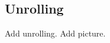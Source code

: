 \documentclass[12pt]{article}
\newtheorem{defn}{Definition}
\theoremstyle{remark}
\def\S{\textsf{S}}
\begin{document}
\subsection{Unrolling}
Add unrolling.
Add picture.

\begin{comment}
\section{Removing Sinks}
\label{sec4}

Let $\S$ be a set of sentence names and $d$ a denotation assignment on $\S$.  If $\chi$ is a constant sentence, then its normal form references no other sentence.  So, if name $\alpha \in \S$ denotes $\chi$, then we can simplify $(\S, d)$ by replacing each occurance of $\alpha$ with $\chi$.  We will show that we can repeatedly apply this operation until no name denotes a constant sentence.

\begin{defn}
Let $G$ be a directed graph.  A vertex $v \in V(G)$ is called a \emph{sink} if $N^+_G(v)$ is empty and a \emph{source} if $N^-_G(v)$ is empty.
\end{defn}

\begin{figure}[h]
\centering
\begin{tikzpicture}[scale = 10]
\tikzstyle{VertexStyle}=[shape = circle,	
								 minimum size = 12pt,
								 inner sep = 1.2pt,
                         draw]
\Vertex[x = 0.605999946594238, y = 0.470000028610229, L = \tiny {x}]{v0}
\Vertex[x = 0.401999980211258, y = 0.712000012397766, L = \tiny {y}]{v1}
\Vertex[x = 0.606000065803528, y = 0.71399998664856, L = \tiny {}]{v2}
\Vertex[x = 0.400000005960464, y = 0.472000002861023, L = \tiny {}]{v3}
\Edge[style = {post}](v1)(v0)
\Edge[style = {pre}](v2)(v1)
\Edge[style = {post}](v2)(v0)
\Edge[style = {pre}](v3)(v1)
\Edge[style = {post}](v3)(v0)
\end{tikzpicture}
\caption{A graph with sink $x$ and source $y$.}
\end{figure}

Note that a constant sentence (in normal form) corresponds to a sink in the graph.\newline

We will need to apply our substition infinitely many times.  To make this precise we need to index over some infinite ordinals.  For a set $X$, we write $|X|$ for the cardinal of $X$ which is the smallest ordinal which is equinumerous with $X$. 


\end{comment}
\end{document}
